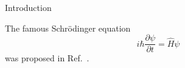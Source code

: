Introduction

The famous Schr{\"o}dinger equation
\begin{equation}
    i\hbar \frac{\partial \psi}{\partial t} = \hat{H}\psi
\label{eq: SE}
\end{equation}
was proposed in Ref.~\cite{Schrodinger1926}.
